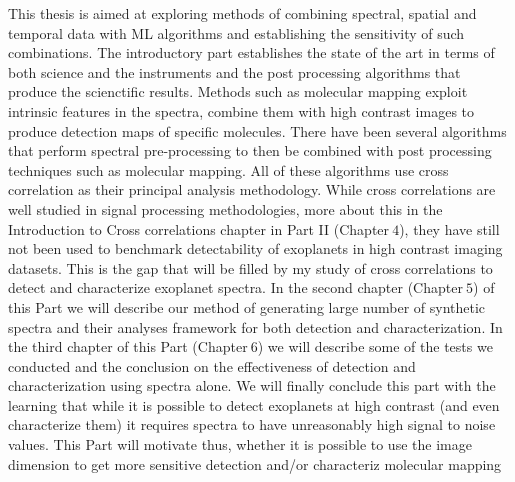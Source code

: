 This thesis is aimed at exploring methods of combining spectral, spatial and temporal data with ML algorithms and establishing the sensitivity 
of such combinations. 
The introductory part establishes the state of the art in terms of both science and the instruments and the post processing algorithms that produce the scienctific results.
Methods such as molecular mapping exploit intrinsic features in the spectra, combine them with high contrast images to produce detection maps of specific molecules.
There have been several algorithms \citep[e.g HRSDI][]{2019Haffert} that perform spectral pre-processing to then be combined with post processing techniques such as molecular mapping.
All of these algorithms use cross correlation as their principal analysis methodology. 
While cross correlations are well studied in signal processing methodologies, more about this in the Introduction to Cross correlations chapter in Part II (Chapter$~4$),
they have still not been used to benchmark detectability of exoplanets in high contrast imaging datasets.
This is the gap that will be filled by my study of cross correlations to detect and characterize exoplanet spectra.
In the second chapter (Chapter$~5$) of this Part we will describe our method of generating large number of synthetic spectra and their analyses framework for both detection and characterization.
In the third chapter of this Part (Chapter$~6$) we will describe some of the tests we conducted and the conclusion on the effectiveness of detection and characterization using spectra alone.
We will finally conclude this part with the learning that while it is possible to detect exoplanets at high contrast (and even characterize them) it requires spectra to have unreasonably high signal to noise values.
This Part will motivate thus, whether it is possible to use the image dimension to get more sensitive detection and/or characteriz molecular mapping

